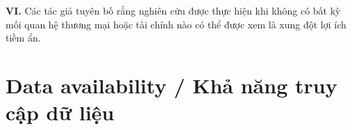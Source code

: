 \documentclass[final,1p,11pt,longtitle]{elsarticle}
\newenvironment{viet}{\par\smallskip\begingroup\color{viColor}\noindent\textbf{VI. }\ignorespaces}{\par\endgroup\smallskip}
\begin{document}
\begin{viet}
Các tác giả tuyên bố rằng nghiên cứu được thực hiện khi không có bất kỳ mối quan hệ thương mại hoặc tài chính nào có thể được xem là xung đột lợi ích tiềm ẩn.
\end{viet}


\section*{Data availability / {\color{viColor} Khả năng truy cập dữ liệu}}





\end{document}

